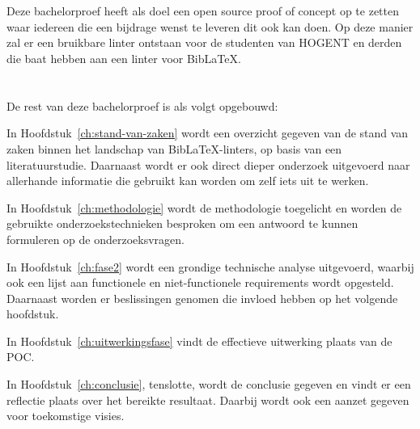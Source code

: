 
\section{}%
\label{sec:onderzoeksdoelstelling}
Deze bachelorproef heeft als doel een open source proof of concept op te zetten waar iedereen die een bijdrage wenst te leveren dit ook kan doen. Op deze manier zal er een bruikbare linter ontstaan voor de studenten van HOGENT en derden die baat hebben aan een linter voor BibLaTeX.

\section{} 
\label{sec:opzet-bachelorproef}


De rest van deze bachelorproef is als volgt opgebouwd:

In Hoofdstuk~\ref{ch:stand-van-zaken} wordt een overzicht gegeven van de stand van zaken binnen het landschap van BibLaTeX-linters, op basis van een literatuurstudie. Daarnaast wordt er ook direct dieper onderzoek uitgevoerd naar allerhande informatie die gebruikt kan worden om zelf iets uit te werken.

In Hoofdstuk~\ref{ch:methodologie} wordt de methodologie toegelicht en worden de gebruikte onderzoekstechnieken besproken om een antwoord te kunnen formuleren op de onderzoeksvragen.

In Hoofdstuk~\ref{ch:fase2} wordt een grondige technische analyse uitgevoerd, waarbij ook een lijst aan functionele en niet-functionele requirements wordt opgesteld. Daarnaast worden er beslissingen genomen die invloed hebben op het volgende hoofdstuk.

In Hoofdstuk~\ref{ch:uitwerkingsfase} vindt de effectieve uitwerking plaats van de \acrlong{POC}.

In Hoofdstuk~\ref{ch:conclusie}, tenslotte, wordt de conclusie gegeven en vindt er een reflectie plaats over het bereikte resultaat. Daarbij wordt ook een aanzet gegeven voor toekomstige visies.
